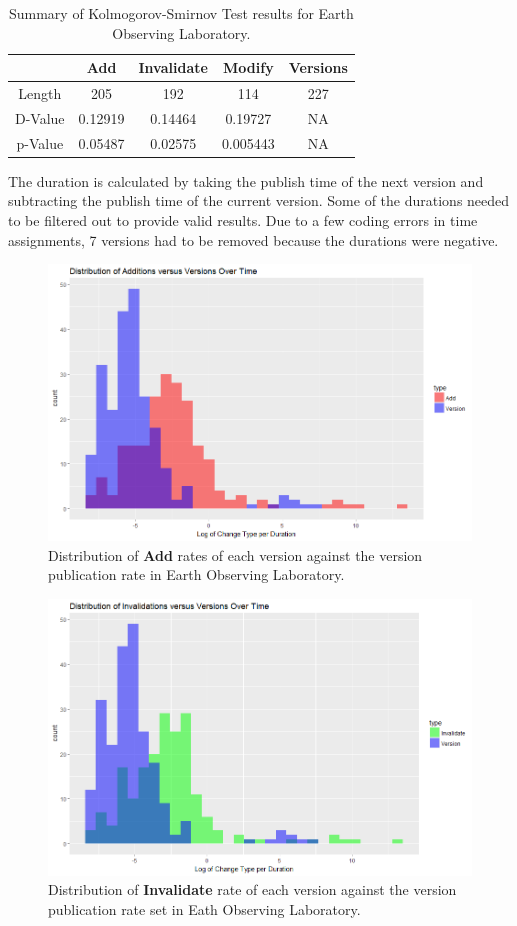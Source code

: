 \begin{table}
	\caption{Summary of Kolmogorov-Smirnov Test results for Earth Observing Laboratory.}
	\label{table:Eol_KS}
	\centering
	\begin{tabular}{|c|c|c|c|c|}
		\hline
		&	Add&	Invalidate&	Modify&	Versions\\ \hline
		Length&	205&	192&	114&	227\\
		D-Value&	0.12919&	0.14464&	0.19727&	NA\\
		p-Value&	0.05487&	0.02575&	0.005443&	NA\\
		\hline
	\end{tabular}
\end{table}
The duration is calculated by taking the publish time of the next \gls{version} and subtracting the publish time of the current \gls{version}.
Some of the durations needed to be filtered out to provide valid results.  
Due to a few coding errors in time assignments, 7 \glspl{version} had to be removed because the durations were negative.  
\begin{figure}
	\centering
	\includegraphics[scale=.5]{figures/Eol_Add_Ver_Rate.png}
	\caption{Distribution of \textbf{Add} rates of each version against the version publication rate in Earth Observing Laboratory.}
	\label{EOL_Add_Ver}
\end{figure}
\begin{figure}%
	\centering
	\includegraphics[scale=.5]{figures/Eol_Inv_Ver_Rate.png}
	\caption{Distribution of \textbf{Invalidate} rate of each version against the version publication rate set in Eath Observing Laboratory.}
	\label{EOL_Inv_Ver}
\end{figure}
